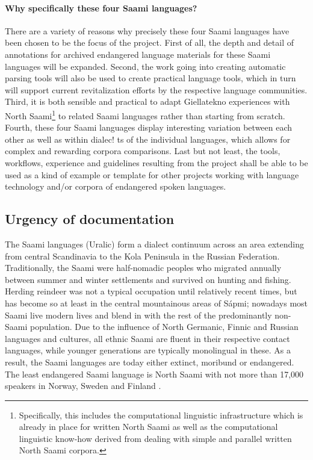\documentclass[a4paper,12pt]{article}
\begin{document}
\paragraph{Why specifically these four Saami languages?}
There are a variety of reasons why precisely these four Saami languages have been chosen to be the focus of the project. First of all, the depth and detail of annotations for archived endangered language materials for these Saami languages will be expanded. Second, the work going into creating automatic parsing tools will also be used to create practical language tools, which in turn will support current revitalization efforts by the respective language communities. Third, it is both sensible and practical to adapt Giellatekno experiences with North Saami\footnote{Specifically, this includes the computational linguistic infrastructure which is already in place for written North Saami as well as the computational linguistic know-how derived from dealing with simple and parallel written North Saami corpora.} to related Saami languages rather than starting from scratch. Fourth, these four Saami languages display interesting variation between each other as well as within dialec!
ts of the individual languages, which allows for complex and rewarding corpora comparisons. Last but not least, the tools, workflows, experience and guidelines resulting from the project shall be able to be used as a kind of example or template for other projects working with language technology and/or corpora of endangered spoken languages.%

\subsection{Urgency of documentation}%
The Saami languages (Uralic) form a dialect continuum across an area extending from central Scandinavia to the Kola Peninsula in the Russian Federation. Traditionally, the Saami were half-nomadic peoples who migrated annually between summer and winter settlements and survived on hunting and fishing. Herding reindeer was not a typical occupation until relatively recent times, but has become so at least in the central mountainous areas of Sápmi; nowadays most Saami live modern lives and blend in with the rest of the predominantly non-Saami population. Due to the influence of North Germanic, Finnic and Russian languages and cultures, all ethnic Saami are fluent in their respective contact languages, while younger generations are typically monolingual in these. As a result, the Saami languages are today either extinct, moribund or endangered. The least endangered Saami language is North Saami with not more than 17,000 speakers in Norway, Sweden and Finland \citep[1]{sammallahti1998b}.
\end{document}
